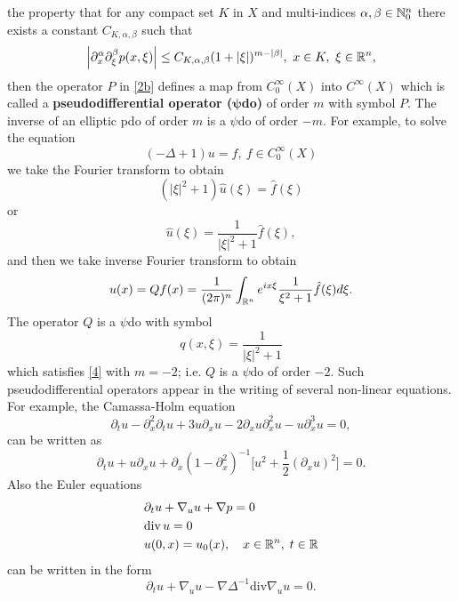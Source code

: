 \documentclass[12pt,reqno]{amsart}
\theoremstyle{plain}  %
\theoremstyle{definition}
\newcommand{\nin}{\noindent}
\begin{document}
the property that for any compact set $ K $ in $ X $ and
multi-indices $ \alpha, \beta \in {\Bbb N^n_0} $ there exists a
constant $ C_{K, \alpha, \beta} $ such that
\begin{equation}
	\begin{split}
		\left | \partial^\alpha_x \partial^\beta_\xi p(x, \xi) \right | \le
C_{K, \alpha, \beta} (1 + |\xi|)^{m - |\beta|}, \ x \in K, \ \xi \in {\Bbb
R^n},
		\label{4}
	\end{split}
\end{equation}
then the operator $ P $ in \eqref{2b} defines a map from $ C^\infty_0 (X) $
into $ C^\infty (X) $ which is called a {\bf pseudodifferential
operator ($\boldsymbol \psi$do)} of order $ m $  with symbol $ P$. 
The inverse of an elliptic pdo of order $ m $ is a $ \psi$do of order
$ -m$.  For example,  to solve the equation
$$(- \Delta + 1) u = f, \ f \in C^\infty_0 (X)$$
we take the Fourier transform to obtain
\begin{equation*}
(|\xi|^2 + 1) \hat u (\xi) = \hat f (\xi)
\end{equation*}
or
\begin{equation*}
	\hat u (\xi) = \frac{1}{|\xi|^2+ 1} \hat f (\xi), 
\end{equation*}
and then we take inverse Fourier transform to obtain
$$u(x) = Qf(x) = \frac{1}{(2 \pi)^n} \int_{{\Bbb R^n}} e^{i x \xi}
\frac{1}{\xi^2 + 1} \hat f (\xi) d \xi. $$
The operator $ Q $ is a $ \psi$do with symbol
$$q(x, \xi) = \frac{1}{|\xi|^2 + 1}$$
which satisfies \eqref{4} with $ m = -2$; i.e. $  Q $ is a $ \psi$do of order
$-2$.
\smallskip
\nin
Such  pseudodifferential operators appear in the writing 
of several non-linear equations. For example, the Camassa-Holm equation
$$
\partial_t u -\partial_x^2\partial_t u+ 3u\partial_x u
-2 \partial_x u\partial_x^2 u
-  u\partial_x^3 u
= 0, 
$$
can be written as
$$
\partial_t u + u\partial_x u
+
\partial_x
\left(
1 - \partial_x^2
\right)^{-1}
 \Big[
u^2 + \frac{1}{2}(\partial_x u)^2
\Big]
= 0.
$$
Also the Euler equations
\begin{equation*}
	\begin{split}
&\partial_{t}u + \nabla_{u}u +\nabla p =0\\
&\text{div}\, u = 0\\   
&u(0, x)= u_0(x), 
\quad 
x\in {{\Bbb R^n}}, \; t\in{\Bbb R}  
\end{split}
\end{equation*}
can be written in the form
%
$$
\partial_{t}u + \nabla_{u}u - \nabla  \Delta^{-1}  {\text{div}} \nabla_{u}u 
=
0.
$$
\end{document}
